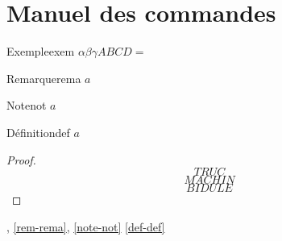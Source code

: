 \documentclass[a4paper,french,final]{memoir}
\begin{document}
\chapter{Manuel des commandes}
\begin{theoremb}{Exemple}{exem}
\(\alpha\beta\gamma ABCD=\)
\end{theoremb}
\begin{remarkb}{Remarque}{rema}
\(a\)
\end{remarkb}
\begin{noteb}{Note}{not}
$a$
\end{noteb}
\begin{defb}{Définition}{def}
$a$
\end{defb}
\begin{proof}
\makeatletter
{}
\[TRUC\]
\proofpart{}
\[MACHIN\]
\[BIDULE\]
\end{proof}
, \cref{rem-rema}, \cref{note-not} \cref{def-def} 
\end{document}
